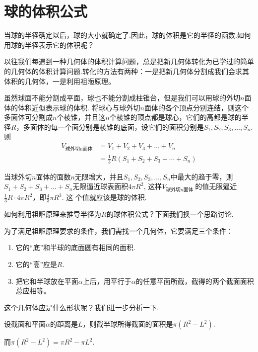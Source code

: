 \section{球的体积公式}

当球的半径确定以后，球的大小就确定了.因此，球的体积是它的半径的函数.如何用球的半径表示它的体积呢？

以往我们每遇到一种几何体的体积计算问题，总是把新几何体转化为已学过的简单的几何体的体积计算问题.转化的方法有两种：一是把新几何体分割成我们会求其体积的几何体，一是利用祖暅原理。

虽然球面不能分割成平面，球也不能分割成柱锥台，但是我们可以用球的外切$n$面体的体积近似表示球的体积. 将球心与球外切$n$面体的各个顶点分别连结，则这个多面体可分割成$n$个棱锥，并且这$n$个棱锥的顶点都是球心，它们的高都是球的半径$R$，多面体的每一个面分别是棱锥的底面，设它们的面积分别是$S_{1},  S_{2},  S_{3},\ldots,  S_{n}$. 则
\[\begin{split}
 V_{\text{球外切$n$面体}}&=V_{1}+V_{2}+V_{3}+\ldots+V_{n}\\
&=\frac{1}{3}R\left(S_{1}+S_{2}+S_{3}+\cdots+S_{n}\right)   
\end{split}\]


当球外切$n$面体的面数$n$无限增大，并且$S_{1},  S_{2},  S_{3},\ldots, S_{n}$中最大的趋于零，则$S_{1}+S_{2}+S_{3}+\ldots+S_{n}$无限逼近球表面积$4\pi R^{2}$, 这样$V_{\text{球外切$n$面体 }}$的值无限逼近$\frac{1}{3}R\cdot 4\pi R^{2}$，即$\frac{4}{3}\pi R^{3}$. 这 
个值就应该是球的体积.

如何利用祖暅原理来推导半径为$R$的球体积公式？下面我们换一个思路讨论.

为了满足祖暅原理要求的条件，我们需找一个几何体，它要满足三个条件：
\begin{enumerate}[(1)]
    \item 它的“底”和半球的底面圆有相同的面积.
    \item 它的“高”应是$R$.
\item 把它和半球放在平面$\alpha$上后，用平行于$\alpha$的任意平面所截，截得的两个截面面积总应相等。
\end{enumerate}

这个几何体应是什么形状呢？我们进一步分析一下.

设截面和平面$\alpha$的距离是$L$，则截半球所得截面的面积是$\pi\left(R^{2}-L^{2}\right)$.

而$\pi \left(R^{2}-L^{2}\right)=\pi R^{2}-\pi  L^{2}$.

